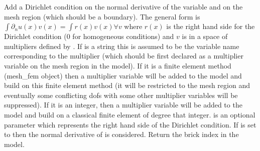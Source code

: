 \documentclass[a4paper,11pt,english]{sphinxmanual}
\begin{document}
\begin{fulllineitems}
\begin{fulllineitems}
\label{\detokenize{python/cmdref_Model:getfem.Model.add_normal_derivative_Dirichlet_condition_with_multipliers}}
Add a Dirichlet condition on the normal derivative of the variable
 and on the mesh region  (which should be a boundary).
The general form is
\(\int \partial_n u(x)v(x) = \int r(x)v(x) \forall v\)
where \(r(x)\) is
the right hand side for the Dirichlet condition (0 for
homogeneous conditions) and \(v\) is in a space of multipliers
defined by .
If  is a string this is assumed
to be the variable name corresponding to the multiplier (which should be
first declared as a multiplier variable on the mesh region in the model).
If it is a finite element method (mesh\_fem object) then a multiplier
variable will be added to the model and build on this finite element
method (it will be restricted to the mesh region  and eventually
some conflicting dofs with some other multiplier variables will be
suppressed). If it is an integer, then a  multiplier variable will be
added to the model and build on a classical finite element of degree
that integer.  is an optional parameter which represents
the right hand side of the Dirichlet condition.
If  is set to  then the normal
derivative of  is considered.
Return the brick index in the model.

\end{fulllineitems}



\end{fulllineitems}
\end{document}
